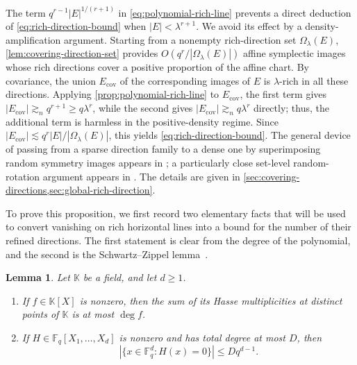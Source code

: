 \documentclass[11pt,letterpaper]{amsart}
\numberwithin{equation}{section}
\newtheorem{lemma}[lemma]{Lemma}
\theoremstyle{definition}
\theoremstyle{remark}
\newcommand{\Fq}{\mathbb F_q}
\begin{document}
The term $q^{r-1}|E|^{1/(r+1)}$ in
\eqref{eq:polynomial-rich-line} prevents a direct deduction of
\eqref{eq:rich-direction-bound} when $|E|<\lambda^{r+1}$.  We avoid its effect by a density-amplification argument.  Starting from a nonempty rich-direction set $\Omega_\lambda(E)$,
\cref{lem:covering-direction-set} provides
$O(q^r/|\Omega_\lambda(E)|)$ affine symplectic images whose rich
directions cover a positive proportion of the affine chart.  By covariance, the union $E_{\mathrm{cov}}$ of the corresponding images of $E$ is $\lambda$-rich in all these directions.  Applying
\cref{prop:polynomial-rich-line} to $E_{\mathrm{cov}}$, the first term gives $|E_{\mathrm{cov}}|\gtrsim_n q^{r+1}\geq q\lambda^r$, while the second gives $|E_{\mathrm{cov}}|\gtrsim_n q\lambda^r$ directly; thus, the additional term is harmless in the positive-density regime. Since $|E_{\mathrm{cov}}|\lesssim q^r|E|/|\Omega_\lambda(E)|$, this yields \eqref{eq:rich-direction-bound}. The general device of passing from a sparse direction family to a dense one by superimposing random symmetry images appears in \cite[Proposition~2.5 and Remark~3.2]{EOT10}; a particularly close set-level random-rotation argument appears in
\cite[Proposition~6]{Salvatore23}. The details are given in
\cref{sec:covering-directions,sec:global-rich-direction}.


To prove this proposition, we first record two elementary facts that will be used to convert vanishing on rich
horizontal lines into a bound for the number of their refined directions. The first statement is clear from the degree of the polynomial, and the second is the Schwartz--Zippel
lemma~\cite{Schwartz80, Zippe79}.


\begin{lemma}
\label{lem:polynomial-zero-bounds}
Let $\mathbb K$ be a field, and let $d\geq1$.
\begin{enumerate}[label=\textup{(\roman*)}]
\item If $f\in\mathbb K[X]$ is nonzero, then the sum of its Hasse
multiplicities at distinct points of $\mathbb K$ is at most $\deg f$.
\item If $H\in\Fq[X_1,\ldots,X_d]$ is nonzero and has total degree at most $D$, then
\[
 |\{x\in\Fq^d:H(x)=0\}|\leq Dq^{d-1}.
\]
\end{enumerate}
\end{lemma}
\end{document}
